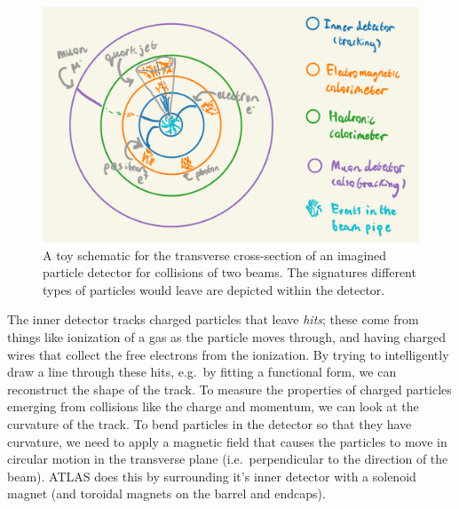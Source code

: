 \documentclass[
  11pt,
  numbers=noendperiod]{book}
\begin{document}
\begin{figure}

{\centering \includegraphics{./images/detector-schematic.pdf}

}

\caption{\label{fig-detector}A toy schematic for the transverse
cross-section of an imagined particle detector for collisions of two
beams. The signatures different types of particles would leave are
depicted within the detector.}

\end{figure}

The inner detector tracks charged particles that leave \emph{hits};
these come from things like ionization of a gas as the particle moves
through, and having charged wires that collect the free electrons from
the ionization. By trying to intelligently draw a line through these
hits, e.g.~by fitting a functional form, we can reconstruct the shape of
the track. To measure the properties of charged particles emerging from
collisions like the charge and momentum, we can look at the curvature of
the track. To bend particles in the detector so that they have
curvature, we need to apply a magnetic field that causes the particles
to move in circular motion in the transverse plane (i.e.~perpendicular
to the direction of the beam). ATLAS does this by surrounding it's inner
detector with a solenoid magnet (and toroidal magnets on the barrel and
endcaps).
\end{document}
